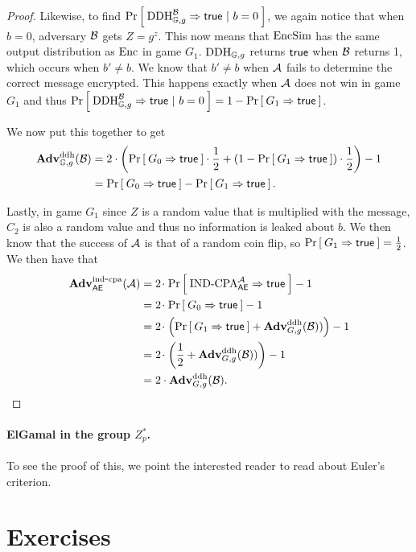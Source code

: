 \begin{proof}
	Likewise, to find $\Prob{\DDH_{\group, g}^\advB\Rightarrow\true \ | \ b=0}$, we again notice that when $b=0$, adversary $\advB$ gets $Z = g^z$. This now means that $\EncSim$ has the same output distribution as $\EncOracle$ in game $G_1$. $\DDH_{\group, g}$ returns $\true$ when $\advB$ returns 1, which occurs when $b'\neq b$. We know that $b' \neq b$ when $\advA$ fails to determine the correct message encrypted. This happens exactly when $\advA$ does not win in game $G_1$ and thus $\Prob{\DDH_{\group, g}^\advB\Rightarrow\true \ | \ b=0} = 1 - \Prob{G_1 \Rightarrow\true}$. 
	
	We now put this together to get
	\begin{align*}
		\AdvDDH{\group,g}{\advB} &= 2 \cdot \left(\Prob{G_0 \Rightarrow\true} \cdot \frac{1}{2} + (1 - \Prob{G_1 \Rightarrow\true})\cdot\frac{1}{2}\right) - 1 \\
		&= \Prob{G_0 \Rightarrow\true} - \Prob{G_1 \Rightarrow\true}.
	\end{align*}
	
	Lastly, in game $G_1$ since $Z$ is a random value that is multiplied with the message, $C_2$ is also a random value and thus no information is leaked about $b$. We then know that the success of $\advA$ is that of a random coin flip, so $\Prob{G_1 \Rightarrow\true} = \frac{1}{2}$. We then have that
	\begin{align*}
		\AdvINDCPA{\AEnc}{\advA} 
		&= 2\cdotsm\Prob{\INDCPA_{\AEnc}^\advA\Rightarrow\true} - 1\\
		&= 2\cdotsm\Prob{G_0\Rightarrow\true} - 1\\
		&= 2\cdotsm\left(\Prob{G_1\Rightarrow\true} + \AdvDDH{G,g}{\advB})\right) - 1\\
		&= 2\cdotsm\left(\frac{1}{2}+ \AdvDDH{G,g}{\advB})\right) - 1 \\
		&= 2 \cdot \AdvDDH{G,g}{\advB}.
	\end{align*}
\end{proof}

\paragraph{ElGamal in the group $Z_p^*$.} 

To see the proof of this, we point the interested reader to read about Euler's criterion. 


\section*{Exercises}

